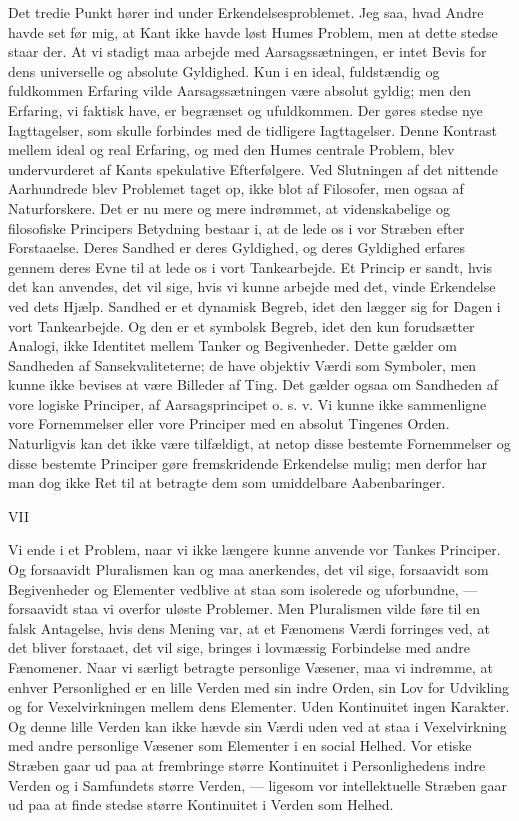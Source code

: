 \documentclass[12pt,a4paper,openany]{book}
\newcommand{\opage}[1]{\marginnote{\footnotesize\textit{[#1]}}}
\begin{document}
Det tredie Punkt hører ind under Erkendelsesproblemet.
Jeg saa, hvad Andre havde set før mig, at Kant ikke havde løst
Humes Problem, men at dette stedse staar der. At vi stadigt
maa arbejde med Aarsagssætningen, er intet Bevis for dens universelle
og absolute Gyldighed. Kun i en ideal, fuldstændig og
fuldkommen Erfaring vilde Aarsagssætningen være absolut gyldig;
men den Erfaring, vi faktisk have, er begrænset og ufuldkommen.
Der gøres stedse nye Iagttagelser, som skulle forbindes
med de tidligere Iagttagelser. Denne Kontrast mellem ideal
og real Erfaring, og med den Humes centrale Problem, blev
undervurderet af Kants spekulative Efterfølgere. Ved Slutningen
af det nittende Aarhundrede blev Problemet taget op, ikke blot
af Filosofer, men ogsaa af Naturforskere. Det er nu mere og
mere indrømmet, at videnskabelige og filosofiske Principers Betydning
bestaar i, at de lede os i vor Stræben efter Forstaaelse.
Deres Sandhed er deres Gyldighed, og deres Gyldighed erfares
gennem deres Evne til at lede os i vort Tankearbejde. Et Princip
er sandt, hvis det kan anvendes, det vil sige, hvis vi kunne
arbejde med det, vinde Erkendelse ved dets Hjælp. Sandhed er
et dynamisk Begreb, idet den lægger sig for Dagen i vort Tankearbejde.
Og den er et symbolsk Begreb, idet den kun forudsætter
Analogi, ikke Identitet mellem Tanker og Begivenheder.
Dette gælder om Sandheden af Sansekvaliteterne; de have objektiv
Værdi som Symboler, men kunne ikke bevises at være Billeder
\setcounter{footnote}{0}%
\opage{26}af Ting. Det gælder ogsaa om Sandheden af vore logiske Principer,
af Aarsagsprincipet o. s. v. Vi kunne ikke sammenligne
vore Fornemmelser eller vore Principer med en absolut Tingenes
Orden. Naturligvis kan det ikke være tilfældigt, at netop disse
bestemte Fornemmelser og disse bestemte Principer gøre fremskridende
Erkendelse mulig; men derfor har man dog ikke Ret
til at betragte dem som umiddelbare Aabenbaringer.

\begin{center}VII\end{center}


Vi ende i et Problem, naar vi ikke længere kunne anvende
vor Tankes Principer. Og forsaavidt Pluralismen kan og maa
anerkendes, det vil sige, forsaavidt som Begivenheder og Elementer
vedblive at staa som isolerede og uforbundne, --- forsaavidt
staa vi overfor uløste Problemer. Men Pluralismen vilde
føre til en falsk Antagelse, hvis dens Mening var, at et Fænomens
Værdi forringes ved, at det bliver forstaaet, det vil sige,
bringes i lovmæssig Forbindelse med andre Fænomener. Naar
vi særligt betragte personlige Væsener, maa vi indrømme, at
enhver Personlighed er en lille Verden med sin indre Orden,
sin Lov for Udvikling og for Vexelvirkningen mellem dens Elementer.
Uden Kontinuitet ingen Karakter. Og denne lille Verden
kan ikke hævde sin Værdi uden ved at staa i Vexelvirkning
med andre personlige Væsener som Elementer i en social Helhed.
Vor etiske Stræben gaar ud paa at frembringe større Kontinuitet
i Personlighedens indre Verden og i Samfundets større
Verden, --- ligesom vor intellektuelle Stræben gaar ud paa at
finde stedse større Kontinuitet i Verden som Helhed.
\end{document}
